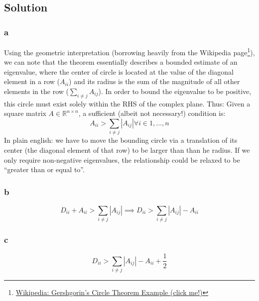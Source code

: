 \documentclass[11pt]{report}
\theoremstyle{definition}
\begin{document}
\subsection*{Solution}
\subsubsection*{a}
Using the geometric interpretation (borrowing heavily from the Wikipedia page\footnote{
	\href{https://en.wikipedia.org/wiki/Gershgorin_circle_theorem\#Example}
	{Wikipedia: Gershgorin's Circle Theorem Example (click me!)}
}), we can note that the theorem essentially describes a bounded estimate of an
eigenvalue, where the center of circle is located at the value of the diagonal
element in a row ($A_{ii}$) and its radius is the sum of the magnitude of all
other elements in the row ($\sum_{i\neq j}A_{ij}$). In order to bound the
eigenvalue to be positive, this circle must exist solely within the RHS of the
complex plane. Thus: Given a square matrix $A\in\mathbb{R}^{n\times n}$, a
sufficient (albeit not necessary!) condition is:
\[ A_{ii} > \sum_{i\neq j}|A_{ij}| \forall i \in 1,\ldots,n \]
In plain english: we have to move the bounding circle via a translation of its
center (the diagonal element of that row) to be larger than than he radius.  If
we only require non-negative eigenvalues, the relationship could be relaxed to
be ``greater than or equal to''.

\subsubsection*{b}
\[
	D_{ii} + A_{ii} > \sum_{i\neq j}|A_{ij}|
	\implies D_{ii} > \sum_{i\neq j}|A_{ij}| - A_{ii}
\]

\subsubsection*{c}
\[
	D_{ii} > \sum_{i\neq j}|A_{ij}| - A_{ii} + \frac{1}{2}
\]
\end{document}
